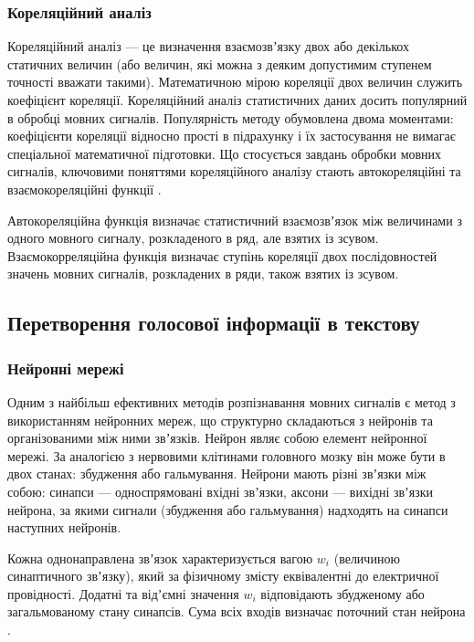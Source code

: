 \subsubsection{Кореляційний аналіз}

Кореляційний аналіз --- це визначення взаємозвʼязку двох або декількох статичних величин (або величин, які можна з деяким допустимим ступенем точності вважати такими). Математичною мірою кореляції двох величин служить коефіцієнт кореляції. Кореляційний аналіз статистичних даних досить популярний в обробці мовних сигналів. Популярність методу обумовлена ​​двома моментами: коефіцієнти кореляції відносно прості в підрахунку і їх застосування не вимагає спеціальної математичної підготовки. Що стосується завдань обробки мовних сигналів, ключовими поняттями кореляційного аналізу стають автокореляційні та взаємокореляційні функції \cite{Баскаков_2001}.

Автокореляційна функція визначає статистичний взаємозвʼязок між величинами з одного мовного сигналу, розкладеного в ряд, але взятих із зсувом. Взаємокорреляційна функція визначає ступінь кореляції двох послідовностей значень мовних сигналів, розкладених в ряди, також взятих із зсувом.

\subsection{Перетворення голосової інформації в текстову}

\subsubsection{Нейронні мережі}

Одним з найбільш ефективних методів розпізнавання мовних сигналів є метод з використанням нейронних мереж, що структурно складаються з нейронів та організованими між ними звʼязків. Нейрон являє собою елемент нейронної мережі. За аналогією з нервовими клітинами головного мозку він може бути в двох станах: збудження або гальмування. Нейрони мають різні звʼязки між собою: синапси --- односпрямовані вхідні звʼязки, аксони --- вихідні звʼязки нейрона, за якими сигнали (збудження або гальмування) надходять на синапси наступних нейронів.

Кожна однонаправлена звʼязок характеризується вагою $w_i$ (величиною синаптичного звʼязку), який за фізичному змісту еквівалентні до електричної провідності. Додатні та відʼємні значення $w_i$ відповідають збудженому або загальмованому стану синапсів. Сума всіх входів визначає поточний стан нейрона \cite{Чураков_2014}.

